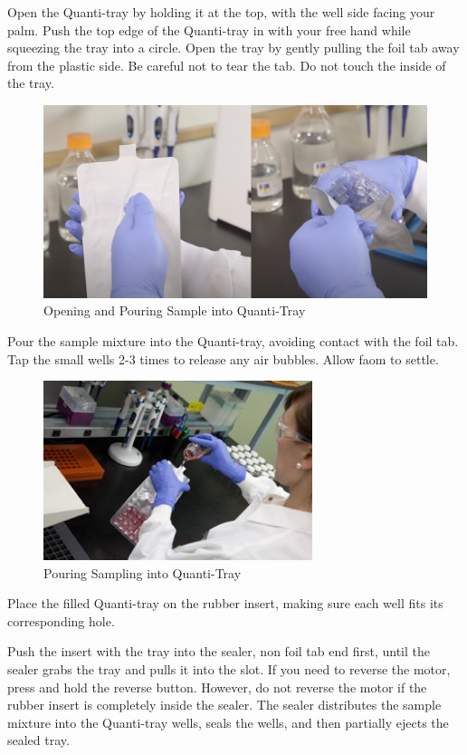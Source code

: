 \documentclass[12pt]{../SOP4_alpha}\usepackage[]{graphicx}\usepackage[]{xcolor}
\begin{document}
\NP Open the Quanti-tray by holding it at the top, with the well side facing your palm. Push the top edge of the Quanti-tray in with your free hand while squeezing the tray into a circle. Open the tray by gently pulling the foil tab away from the plastic side. Be careful not to tear the tab. Do not touch the inside of the tray. 

\begin{figure}
\includegraphics[width=1\textwidth]{figures/OpeningQuanti-Tray.png}
\caption{Opening and Pouring Sample into Quanti-Tray}
\label{fig:Adding Reagent}
\end{figure}

\clearpage

\NP Pour the sample mixture into the Quanti-tray, avoiding contact with the foil tab. Tap the small wells 2-3 times to release any air bubbles. Allow faom to settle.

\begin{figure}
\includegraphics[width=0.7\textwidth]{figures/Step2.jpg}
\caption{Pouring Sampling into Quanti-Tray}
\end{figure}

\NP Place the filled Quanti-tray on the rubber insert, making sure each well fits its corresponding hole.

\NP Push the insert with the tray into the sealer, non foil tab end first, until the sealer grabs the tray and pulls it into the slot. If you need to reverse the motor, press and hold the reverse button. However, do not reverse the motor if the rubber insert is completely inside the sealer.
The sealer distributes the sample mixture into the Quanti-tray wells, seals the wells, and then partially ejects the sealed tray.
\end{document}
